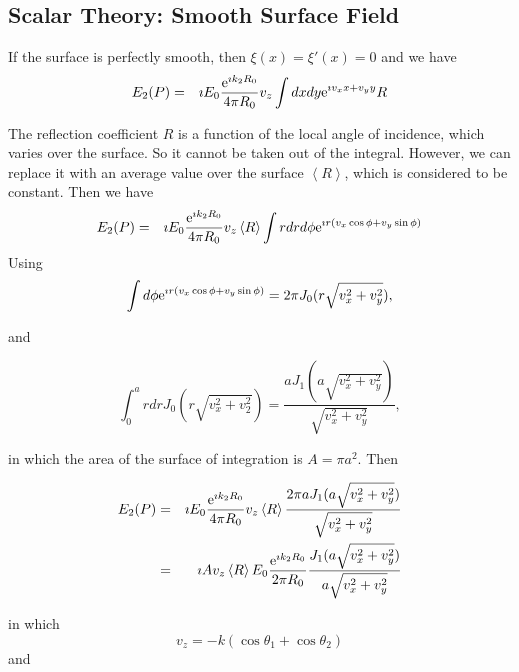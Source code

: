 \documentclass[11pt]{article}
\newcommand{\e}{{\rm e}}
\begin{document}
{{{{%
\subsection{Scalar Theory: Smooth Surface Field}

If the surface is perfectly smooth, then $\xi(x)=\xi'(x)=0$ and we have
\begin{eqnarray}
E_{2}(P)&=&\imath  E_{0}\frac{\e^{\imath k_{2}R_{0}}}{4\pi R_{0}}v_{z}
\int dx dy\e^{\imath v_{x}x+v_{y}y}R
\end{eqnarray}

The reflection coefficient $R$ is a function of the local angle of
incidence, which varies over the surface.  So it cannot be taken out
of the integral. However, we can replace it with an average value over
the surface $\left<R\right>$, which is considered to be constant. Then
we have 
  \begin{eqnarray} E_{2}(P)&=&\imath E_{0}\frac{\e^{\imath
k_{2}R_{0}}}{4\pi R_{0}}v_{z}\left<R\right>\int rdr d\phi\e^{\imath
r(v_{x}\cos\phi+v_{y}\sin\phi)}
  \end{eqnarray}
Using
  \begin{equation}
\int d\phi\e^{\imath r(v_{x}\cos\phi+v_{y}\sin\phi)}=2\pi J_{0}(r\sqrt{v_{x}^{2}+v_{y}^{2}}),
  \end{equation}

and

   \begin{equation}
\int_{0}^{a}rdrJ_{0}(r\sqrt{v_{x}^{2}+v_{2}^{2}})=
\frac{aJ_{1}(a\sqrt{v_{x}^{2}+v_{y}^{2}})}{\sqrt{v_{x}^{2}+v_{y}^{2}}},
  \end{equation}
 
 in which the area of the surface of integration is $A=\pi a^{2}.$ Then

\begin{eqnarray}
E_{2}(P)&=&\imath  E_{0}\frac{\e^{\imath k_{2}R_{0}}}{4\pi R_{0}}v_{z}\left<R\right>\frac{2\pi aJ_{1}(a\sqrt{v_{x}^{2}+v_{y}^{2}})}{\sqrt{v_{x}^{2}+v_{y}^{2}}}\\
&=&\imath  Av_{z}\left<R\right>E_{0}\frac{\e^{\imath k_{2}R_{0}}}{2\pi R_{0}}\frac{J_{1}(a\sqrt{v_{x}^{2}+v_{y}^{2}})}{a\sqrt{v_{x}^{2}+v_{y}^{2}}}\end{eqnarray}

in which 
  \begin{equation}
v_{z}=-k(\cos{\theta_{1}}+\cos{\theta_{2}})
  \end{equation}
and

}}}}
\end{document}
